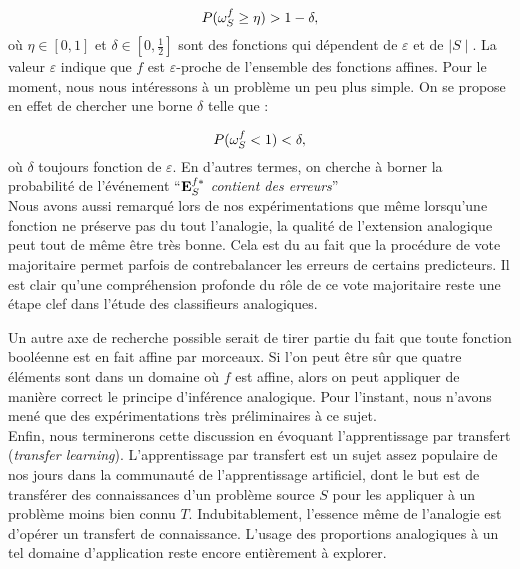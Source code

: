 $$P(\omega_{S}^{f} \geq \eta) > 1 - \delta,$$
où $\eta \in [0, 1]$ et $\delta \in [0, \frac{1}{2}]$ sont des fonctions 
qui dépendent de $\varepsilon$ et de $\mid S \mid$. La valeur $\varepsilon$
indique que $f$ est $\varepsilon$-proche de l'ensemble des fonctions affines.
Pour le moment, nous nous intéressons à un problème un peu plus simple. On se
propose en effet de chercher une borne $\delta$ telle que :

$$P(\omega_{S}^{f} < 1) < \delta,$$
où $\delta$ toujours fonction de $\varepsilon$.  En d'autres termes, on
cherche à borner la probabilité de l'événement ``\textit{$\mathbf{E}_{S}^{f*}$ contient des
erreurs}''\\


Nous avons aussi remarqué lors de nos expérimentations que même lorsqu'une
fonction ne préserve pas du tout l'analogie, la qualité de l'extension
analogique peut tout de même être très bonne. Cela est du au fait que la
procédure de vote majoritaire permet parfois de contrebalancer les erreurs de
certains predicteurs. Il est clair qu'une compréhension profonde du rôle de ce
vote majoritaire reste une étape clef dans l'étude des classifieurs
analogiques.

Un autre axe de recherche possible serait de tirer partie du fait que toute
fonction booléenne est en fait affine par morceaux. Si l'on peut être sûr que
quatre éléments sont dans un domaine où $f$ est affine, alors on peut appliquer
de manière correct le principe d'inférence analogique. Pour l'instant, nous
n'avons mené que des expérimentations très préliminaires  à ce sujet.\\

Enfin, nous terminerons cette discussion en évoquant l'apprentissage par
transfert (\textit{transfer learning}). L'apprentissage par transfert est un
sujet assez populaire de nos jours dans la communauté de l'apprentissage
artificiel, dont le but est de transférer des connaissances d'un problème
source $S$ pour les appliquer à un problème moins bien connu $T$.
Indubitablement, l'essence même de l'analogie est d'opérer un transfert de
connaissance. L'usage des proportions analogiques à un tel domaine
d'application reste encore entièrement à explorer.
